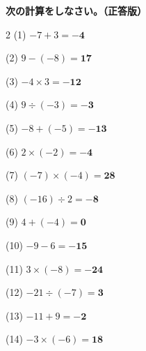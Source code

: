 \documentclass[a4paper, 11pt]{ltjsarticle}
\begin{document}
\hspace{1em} {\Large \textbf{次の計算をしなさい。（正答版）}}
\hfill


\vspace*{5ex}

\begin{multicols*}{2}
\noindent (1) \quad $-7+3 = \mathbf{-4}$
\vspace*{\fill}

\noindent (2) \quad $9-(-8) = \mathbf{17}$
\vspace*{\fill}

\noindent (3) \quad $-4\times3 = \mathbf{-12}$
\vspace*{\fill}

\noindent (4) \quad $9\div(-3) = \mathbf{-3}$
\vspace*{\fill}

\noindent (5) \quad $-8+(-5) = \mathbf{-13}$
\vspace*{\fill}

\noindent (6) \quad $2\times(-2) = \mathbf{-4}$
\vspace*{\fill}

\noindent (7) \quad $(-7)\times(-4) = \mathbf{28}$
\vspace*{\fill}

\noindent (8) \quad $(-16)\div2 = \mathbf{-8}$
\vspace*{\fill}

\noindent (9) \quad $4+(-4) = \mathbf{0}$
\vspace*{\fill}

\noindent (10) \quad $-9-6 = \mathbf{-15}$
\vspace*{\fill}
\columnbreak

\noindent (11) \quad $3\times(-8) = \mathbf{-24}$
\vspace*{\fill}

\noindent (12) \quad $-21\div(-7) = \mathbf{3}$
\vspace*{\fill}

\noindent (13) \quad $-11+9 = \mathbf{-2}$
\vspace*{\fill}

\noindent (14) \quad $-3\times(-6) = \mathbf{18}$
\vspace*{\fill}


\end{multicols*}
\end{document}
